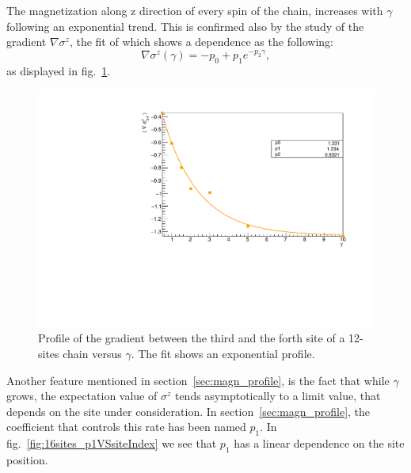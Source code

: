 The magnetization along z direction of every spin of the chain, increases with $\gamma$ following an exponential trend. This is confirmed also by the study of the gradient $\nabla \sigma^z$, the fit of which shows a dependence as the following:
\begin{equation*}
    \nabla \sigma^z (\gamma) = - p_0 + p_1 e^{-p_2\gamma},
\end{equation*}
as displayed in fig.~\ref{fig:FIT_12sites_gradLM34VSgamma}.
\begin{figure}[H]
    \centering
    \captionsetup{width=1.\linewidth}
    \includegraphics[scale=0.6]{Figures/12sites/12sites_gradLM_3and4VSgamma.pdf}
    \caption{Profile of the gradient between the third and the forth site of a 12-sites chain versus $\gamma$. The fit shows an exponential profile.}
    \label{fig:FIT_12sites_gradLM34VSgamma}
\end{figure}

Another feature mentioned in section~\ref{sec:magn_profile}, is the fact that while $\gamma$ grows, the expectation value of $\sigma^z$ tends asymptotically to a limit value, that depends on the site under consideration. In section~\ref{sec:magn_profile}, the coefficient that controls this rate has been named $p_1$. In fig.~\ref{fig:16sites_p1VSsiteIndex} we see that $p_1$ has a linear dependence on the site position.

